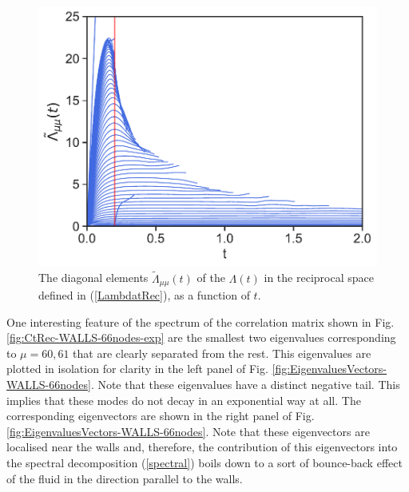 \documentclass[b5paper,openright,10pt]{book}
\begin{document}
\begin{figure}[h!]
  \centering
\includegraphics[scale=0.41]{LambdatRec-WALLS-66nodes}
\caption[Diagonal elements  $\tilde{\Lambda}_{\mu\mu}(t)$ of $\Lambda(t)$ in the reciprocal space for a confined fluid - Thin bins]{The  diagonal elements  $\tilde{\Lambda}_{\mu\mu}(t)$ of  the
  $\Lambda(t)$ in the reciprocal space defined in (\ref{LambdatRec}), as a
function of $t$.}
\label{fig:LambdatRec-WALLS-66nodes}
\end{figure}

One  interesting feature  of the  spectrum of  the correlation  matrix
shown  in  Fig.  \ref{fig:CtRec-WALLS-66nodes-exp}  are  the  smallest two  eigenvalues
corresponding to $\mu=60,61$  that are clearly separated from the rest.
This eigenvalues are plotted in isolation for clarity in the left panel
of  Fig.  \ref{fig:EigenvaluesVectors-WALLS-66nodes}.   Note that  these eigenvalues  have a
distinct negative tail. This implies that  these modes do not decay in
an exponential way at all. The corresponding eigenvectors are shown in
the  right  panel of  Fig.   \ref{fig:EigenvaluesVectors-WALLS-66nodes}.   Note that  these
eigenvectors  are  localised  near   the  walls  and,  therefore,  the
contribution  of this  eigenvectors  into  the spectral  decomposition
(\ref{spectral}) boils  down to  a sort of  bounce-back effect  of the
fluid in the direction parallel to the walls.
\end{document}
